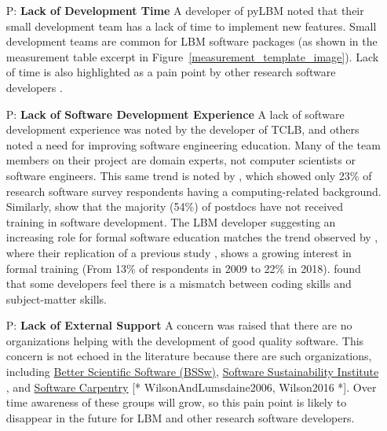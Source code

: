 \documentclass[runningheads]{llncs}
\newcounter{pnum} %
\begin{document}
\begin{enumerate}

	\item[P\refstepcounter{pnum}\thepnum \label{P_LackDevTime}:] \textbf{Lack of
	Development Time} A developer of pyLBM noted that their small development
	team has a lack of time to implement new features. Small development teams
	are common for LBM software packages (as shown in the measurement table
	excerpt in Figure~\ref{measurement_template_image}). Lack of time is also
	highlighted as a pain point by other research software developers
	\cite{PintoEtAl2018,PintoEtAl2016,WieseEtAl2019}.

	\item[P\refstepcounter{pnum}\thepnum \label{P_LackSoftDevExp}:] \textbf{Lack
	of Software Development Experience} A lack of software development
	experience was noted by the developer of TCLB, and others noted a need for
	improving software engineering education. Many of the team members on their
	project are domain experts, not computer scientists or software engineers.
	This same trend is noted by \cite{Nguyen-HoanEtAl2010}, which showed only
	23\% of research software survey respondents having a computing-related
	background. Similarly, \cite{UditAndKatz2017} show that the majority (54\%)
	of postdocs have not received training in software development.  The LBM
	developer suggesting an increasing role for formal software education
	matches the trend observed by \cite{PintoEtAl2018}, where their replication
	of a previous study \cite{HannayEtAl2009}, shows a growing interest in
	formal training (From 13\% of respondents in 2009 to 22\% in 2018).
	\cite{PintoEtAl2018} found that some developers feel there is a mismatch
	between coding skills and subject-matter skills. 
	
	\item[P\refstepcounter{pnum}\thepnum \label{P_LackExtSupport}:] \textbf{Lack
	of External Support} A concern was raised that there are no organizations
	helping with the development of good quality software.  This concern is not
	echoed in the literature because there are such organizations, including
	\href{https://bssw.io/} {Better Scientific Software (BSSw)},
	\href{https://www.software.ac.uk/} {Software Sustainability Institute}
	\cite{CrouchEtAl2013}, and \href{https://software-carpentry.org/}{Software
	Carpentry} [* {WilsonAndLumsdaine2006, Wilson2016} *]. Over time awareness of
	these groups will grow, so this pain point is likely to disappear in the
	future for LBM and other research software developers.

\end{enumerate}
\end{document}
